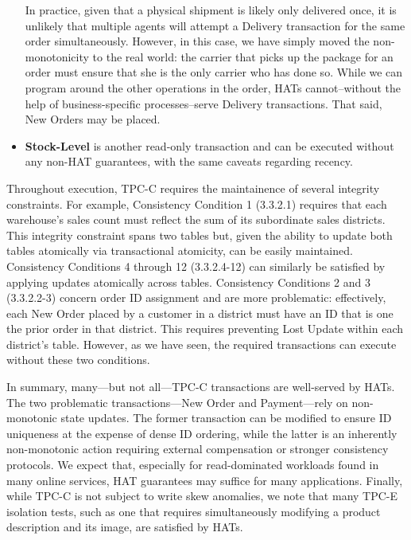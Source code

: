 \begin{itemize}
  In practice, given that a physical shipment is likely only delivered
  once, it is unlikely that multiple agents will attempt a Delivery
  transaction for the same order simultaneously. However, in this
  case, we have simply moved the non-monotonicity to the real world:
  the carrier that picks up the package for an order must ensure that
  she is the only carrier who has done so. While we can program around
  the other operations in the order, HATs cannot--without the help of
  business-specific processes--serve Delivery transactions. That said,
  New Orders may be placed.

\item \textbf{Stock-Level} is another read-only transaction and can be
  executed without any non-HAT guarantees, with the same caveats
  regarding recency.
\end{itemize}

Throughout execution, TPC-C requires the maintainence of several
integrity constraints. For example, Consistency Condition 1 (3.3.2.1)
requires that each warehouse's sales count must reflect the sum of its
subordinate sales districts. This integrity constraint spans two
tables but, given the ability to update both tables atomically via
transactional atomicity, can be easily maintained. Consistency
Conditions 4 through 12 (3.3.2.4-12) can similarly be satisfied by
applying updates atomically across tables. Consistency Conditions 2
and 3 (3.3.2.2-3) concern order ID assignment and are more
problematic: effectively, each New Order placed by a customer in a
district must have an ID that is one the prior order in that
district. This requires preventing Lost Update within each district's
table. However, as we have seen, the required transactions can execute
without these two conditions.

In summary, many---but not all---TPC-C transactions are well-served by
HATs. The two problematic transactions---New Order and Payment---rely
on non-monotonic state updates. The former transaction can be modified
to ensure ID uniqueness at the expense of dense ID ordering, while the
latter is an inherently non-monotonic action requiring external
compensation or stronger consistency protocols. We expect that,
especially for read-dominated workloads found in many online services,
HAT guarantees may suffice for many applications. Finally, while TPC-C
is not subject to write skew anomalies, we note that many TPC-E
isolation tests, such as one that requires simultaneously modifying a
product description and its image, are satisfied by HATs.

